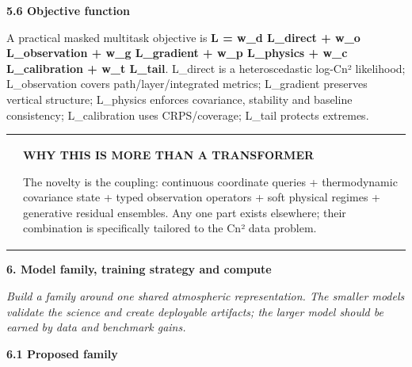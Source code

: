 \documentclass[
]{article}
\begin{document}
\textbf{5.6 Objective function}

A practical masked multitask objective is \textbf{L = w\_d L\_direct +
w\_o L\_observation + w\_g L\_gradient + w\_p L\_physics + w\_c
L\_calibration + w\_t L\_tail}. L\_direct is a heteroscedastic log-Cn²
likelihood; L\_observation covers path/layer/integrated metrics;
L\_gradient preserves vertical structure; L\_physics enforces
covariance, stability and baseline consistency; L\_calibration uses
CRPS/coverage; L\_tail protects extremes.

\begin{longtable}[]{@{}
  >{\raggedright\arraybackslash}p{}
  >{\raggedright\arraybackslash}p{}@{}}
\toprule\noalign{}
\endhead
\bottomrule\noalign{}
\endlastfoot
& \textbf{WHY THIS IS MORE THAN A TRANSFORMER}

The novelty is the coupling: continuous coordinate queries +
thermodynamic covariance state + typed observation operators + soft
physical regimes + generative residual ensembles. Any one part exists
elsewhere; their combination is specifically tailored to the Cn² data
problem. \\
\end{longtable}

\textbf{6. Model family, training strategy and compute}

\emph{Build a family around one shared atmospheric representation. The
smaller models validate the science and create deployable artifacts; the
larger model should be earned by data and benchmark gains.}

\textbf{6.1 Proposed family}
\end{document}
